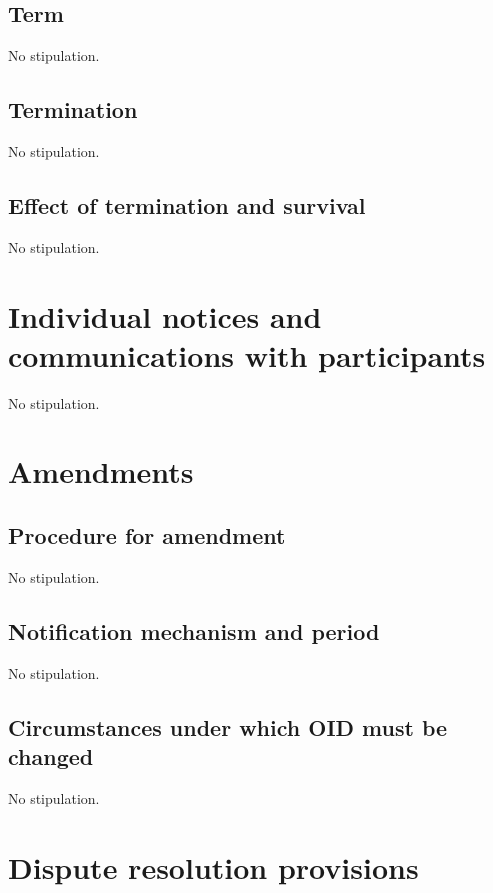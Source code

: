 \documentclass[11pt,a4paper,titlepage]{book}
\begin{document}
\subsection{Term}

No stipulation.

\subsection{Termination}

No stipulation.


\subsection{Effect of termination and survival}

No stipulation.

\section{Individual notices and communications with participants}

No stipulation.

\section{Amendments}


\subsection{Procedure for amendment}

No stipulation.

\subsection{Notification mechanism and period}

No stipulation.

\subsection{Circumstances under which OID must be changed}

No stipulation.

\section{Dispute resolution provisions}
\end{document}
